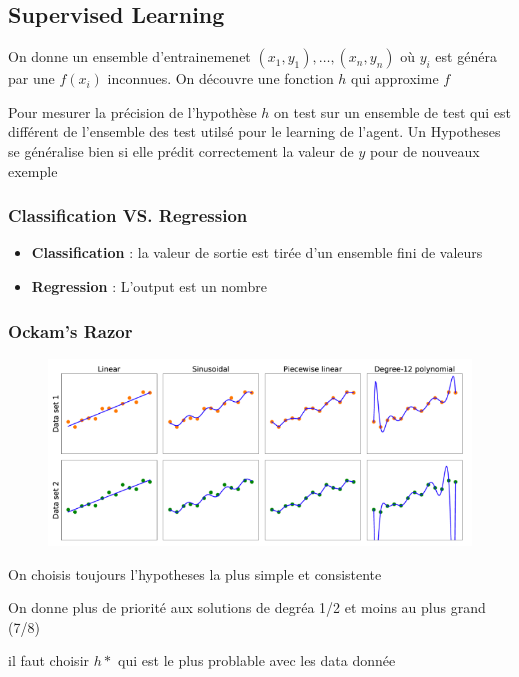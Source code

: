 \documentclass[12pt]{article}
\begin{document}
	\subsection{Supervised Learning}
		On donne un ensemble d'entrainemenet $(x_1,y_1), \dots , (x_n, y_n)$
			 où $y_i$ est généra par une $f(x_i)$ inconnues. On découvre une fonction $h$ qui approxime $f$
			
			Pour mesurer la précision de l'hypothèse $h$ on test sur un ensemble de test qui est différent de l'ensemble des test utilsé pour le learning de l'agent.
			Un Hypotheses se généralise bien si elle prédit correctement la valeur de $y$ pour de nouveaux exemple
		\subsubsection{Classification VS. Regression}
			\begin{itemize}
				\item \textbf{Classification} : la valeur de sortie est tirée d'un ensemble fini de valeurs
				\item \textbf{Regression} : L'output est un nombre
			
			\end{itemize}
			
		\subsubsection{Ockam's Razor}
			\begin{figure}[H]
				\centering
				\includegraphics[width=\textwidth]{img/razor.png}
			\end{figure}
			
			On choisis toujours l'hypotheses la plus simple et consistente
			
			On donne plus de priorité aux solutions de degréa 1/2 et moins au plus grand (7/8)
			
			il faut choisir $h*$ qui est le plus problable avec les data donnée
			
\end{document}

